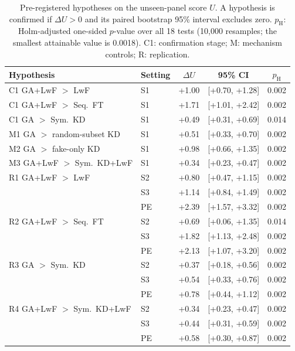 \documentclass{ieeeaccess}
\begin{document}
\begin{table}[t]
\caption{Pre-registered hypotheses on the unseen-panel score $U$. A hypothesis is confirmed if $\Delta U>0$ and its paired bootstrap 95\% interval excludes zero. $p_{\mathrm{H}}$: Holm-adjusted one-sided $p$-value over all 18 tests (10{,}000 resamples; the smallest attainable value is 0.0018). C1: confirmation stage; M: mechanism controls; R: replication.}
\label{tab:hyp}
\centering
\footnotesize
\setlength{\tabcolsep}{2.4pt}
\begin{tabular}{@{}llccc@{}}
\toprule
Hypothesis & Setting & $\Delta U$ & 95\% CI & $p_{\mathrm{H}}$ \\
\midrule
C1 GA+LwF $>$ LwF & S1 & +1.00 & [+0.70, +1.28] & 0.002 \\
C1 GA+LwF $>$ Seq.\ FT & S1 & +1.71 & [+1.01, +2.42] & 0.002 \\
C1 GA $>$ Sym.\ KD & S1 & +0.49 & [+0.31, +0.69] & 0.014 \\
\midrule
M1 GA $>$ random-subset KD & S1 & +0.51 & [+0.33, +0.70] & 0.002 \\
M2 GA $>$ fake-only KD & S1 & +0.98 & [+0.66, +1.35] & 0.002 \\
M3 GA+LwF $>$ Sym.\ KD+LwF & S1 & +0.34 & [+0.23, +0.47] & 0.002 \\
\midrule
R1 GA+LwF $>$ LwF & S2 & +0.80 & [+0.47, +1.15] & 0.002 \\
 & S3 & +1.14 & [+0.84, +1.49] & 0.002 \\
 & PE & +2.39 & [+1.57, +3.32] & 0.002 \\
R2 GA+LwF $>$ Seq.\ FT & S2 & +0.69 & [+0.06, +1.35] & 0.014 \\
 & S3 & +1.82 & [+1.13, +2.48] & 0.002 \\
 & PE & +2.13 & [+1.07, +3.20] & 0.002 \\
R3 GA $>$ Sym.\ KD & S2 & +0.37 & [+0.18, +0.56] & 0.002 \\
 & S3 & +0.54 & [+0.33, +0.76] & 0.002 \\
 & PE & +0.78 & [+0.44, +1.12] & 0.002 \\
R4 GA+LwF $>$ Sym.\ KD+LwF & S2 & +0.34 & [+0.23, +0.47] & 0.002 \\
 & S3 & +0.44 & [+0.31, +0.59] & 0.002 \\
 & PE & +0.58 & [+0.30, +0.87] & 0.002 \\
\bottomrule
\end{tabular}
\end{table}
\end{document}
